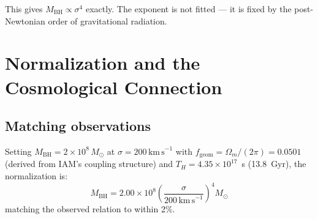 \documentclass[12pt,a4paper]{article}
\begin{document}
This gives $M_\mathrm{BH} \propto \sigma^4$ exactly. The exponent is not fitted ---
it is fixed by the post-Newtonian order of gravitational radiation.

\section{Normalization and the Cosmological Connection}

\subsection{Matching observations}

Setting $M_\mathrm{BH} = 2 \times 10^8\,M_\odot$ at $\sigma = 200\,\mathrm{km\,s}^{-1}$
with $f_\mathrm{geom} = \Omega_m/(2\pi) = 0.0501$ (derived from IAM's coupling
structure) and $T_H = 4.35 \times 10^{17}$~s (13.8~Gyr), the normalization is:
\begin{equation}
M_\mathrm{BH} = 2.00 \times 10^8 \left(\frac{\sigma}{200\,\mathrm{km\,s}^{-1}}\right)^4 M_\odot
\end{equation}
matching the observed relation to within 2\%.

\begin{table}[h]
\centering
\caption{Comparison of $M$--$\sigma$ derivations. IAM matches the normalization to
2\% with one cosmological identification ($f_\mathrm{geom} = \Omega_m/(2\pi)$);
King (2003) requires two astrophysical free parameters and is 84\% high.}
\label{tab:comparison}
\end{table}
\end{document}
